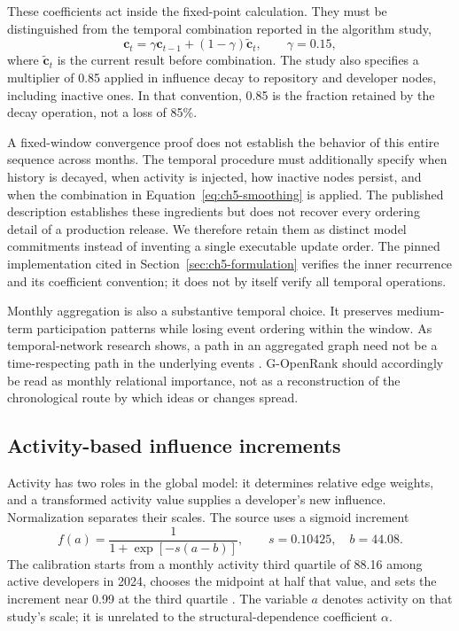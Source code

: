 These coefficients act inside the fixed-point calculation. They must be distinguished from the temporal combination reported in the algorithm study,
\begin{equation}
 \boldsymbol c_t=\gamma\boldsymbol c_{t-1}
 +(1-\gamma)\widetilde{\boldsymbol c}_t,
 \qquad \gamma=0.15,
 \label{eq:ch5-smoothing}
\end{equation}
where \(\widetilde{\boldsymbol c}_t\) is the current result before combination. The study also specifies a multiplier of 0.85 applied in influence decay to repository and developer nodes, including inactive ones. In that convention, 0.85 is the fraction retained by the decay operation, not a loss of 85\%.

A fixed-window convergence proof does not establish the behavior of this entire sequence across months. The temporal procedure must additionally specify when history is decayed, when activity is injected, how inactive nodes persist, and when the combination in Equation~\ref{eq:ch5-smoothing} is applied. The published description establishes these ingredients but does not recover every ordering detail of a production release. We therefore retain them as distinct model commitments instead of inventing a single executable update order. The pinned implementation cited in Section~\ref{sec:ch5-formulation} verifies the inner recurrence and its coefficient convention; it does not by itself verify all temporal operations.

Monthly aggregation is also a substantive temporal choice. It preserves medium-term participation patterns while losing event ordering within the window. As temporal-network research shows, a path in an aggregated graph need not be a time-respecting path in the underlying events \citep{holme2012}. G-OpenRank should accordingly be read as monthly relational importance, not as a reconstruction of the chronological route by which ideas or changes spread.

\subsection{Activity-based influence increments}
Activity has two roles in the global model: it determines relative edge weights, and a transformed activity value supplies a developer's new influence. Normalization separates their scales. The source uses a sigmoid increment
\begin{equation}
 f(a)=\frac{1}{1+\exp[-s(a-b)]},
 \qquad s=0.10425,\quad b=44.08.
 \label{eq:ch5-sigmoid}
\end{equation}
The calibration starts from a monthly activity third quartile of 88.16 among active developers in 2024, chooses the midpoint at half that value, and sets the increment near 0.99 at the third quartile \citep[Section 3.2.3]{han2026rank}. The variable \(a\) denotes activity on that study's scale; it is unrelated to the structural-dependence coefficient \(\alpha\).

